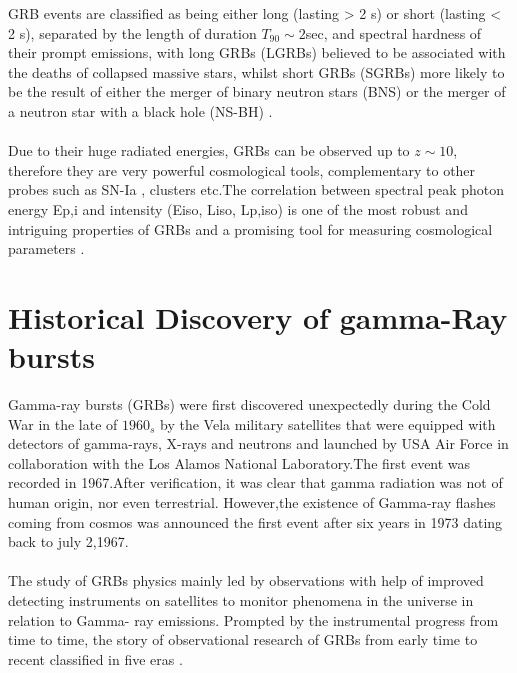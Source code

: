 GRB  events are  classified   as being  either  long  (lasting > 2 s) or short (lasting < 2 s), separated  by  the length  of duration $T_{90} \sim 2 $sec, and  spectral hardness of their prompt emissions, with long  GRBs (LGRBs) believed to be associated with the  deaths of collapsed  massive  stars, whilst  short  GRBs (SGRBs) more likely to be  the  result of  either  the  merger of  binary  neutron  stars (BNS) or the  merger  of  a neutron  star  with  a black  hole (NS-BH) \citep{3}.\\\\
Due to their huge radiated energies, GRBs can be observed up to $z  \sim 10$, therefore they are very powerful cosmological tools, complementary to other probes such as SN-Ia , clusters etc.The correlation between spectral peak photon energy Ep,i and intensity (Eiso, Liso, Lp,iso) is one of the most robust and intriguing properties of GRBs and a promising tool for measuring cosmological parameters \citep{2,3}.
\section{Historical Discovery of gamma-Ray bursts }
Gamma-ray bursts (GRBs) were first discovered unexpectedly during the Cold War
in the late of $1960_{s}$  by the Vela military satellites that  were equipped with detectors of gamma-rays, X-rays and neutrons and launched by USA Air Force in collaboration with the Los Alamos National Laboratory.The first event was recorded in 1967.After verification, it was clear that gamma radiation was not of human origin, nor even terrestrial. However,the existence of Gamma-ray flashes coming from cosmos was  announced the first event after six years in 1973 dating back to july 2,1967. \citep{ 4 }\\\\ 
The study of GRBs physics mainly led by observations with help of improved detecting instruments on satellites to monitor phenomena in the universe in relation to  Gamma- ray emissions.  Prompted by the instrumental progress from time to time, the story of observational research of GRBs from early time to recent  classified in five eras . \citep{ 4 , 5}\\\\
